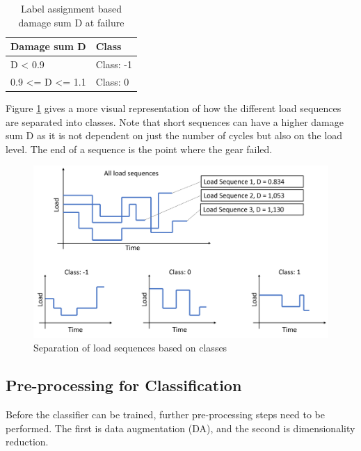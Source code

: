 \begin{table}
	\begin{center}
		\begin{tabular}{|| l | l ||}
			\hline
			\rule{0pt}{2ex}Damage sum D & Class\\
			\hline
			\hline
			\rule{0pt}{2ex}D < 0.9 & Class: -1\\\hline
			0.9 <= D <= 1.1 & Class:  0\\	\hline

		\end{tabular}
		\caption{Label assignment based damage sum D at failure}
		\label{DamageClass}
	\end{center}
	\vspace{-4mm}
\end{table}


Figure \ref{fig:SBC1} gives a more visual representation of how the different load sequences are separated into classes. Note that short sequences can have a higher damage sum D as it is not dependent on just the number of cycles but also on the load level. The end of a sequence is the point where the gear failed. 

\begin{figure}[H]
	\centering
	\includegraphics[width=0.9\linewidth]{IMGs/SBC1.png}
	\caption{Separation of load sequences based on classes}
	\label{fig:SBC1}
\end{figure}

\subsection{Pre-processing for Classification}\label{prep_class}
Before the classifier can be trained, further pre-processing steps need to be performed. The first is data augmentation (DA), and the second is dimensionality reduction. 

